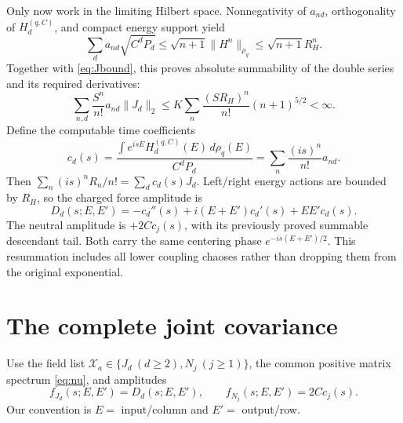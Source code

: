 \documentclass[11pt]{article}
\newcommand{\HH}{H^{(q,C)}}
\begin{document}
Only now work in the limiting Hilbert space. Nonnegativity of $a_{nd}$,
orthogonality of $\HH_d$, and compact energy support yield
\begin{equation}
 \sum_d a_{nd}\sqrt{C^dP_d}
 \le\sqrt{n+1}\|H^n\|_{\rho_q}\le\sqrt{n+1}R_H^n.
\end{equation}
Together with \eqref{eq:Jbound}, this proves absolute summability
of the double series and its required derivatives:
\begin{equation}
 \sum_{n,d}\frac{S^n}{n!}a_{nd}\|J_d\|_2
 \le K\sum_n\frac{(SR_H)^n}{n!}(n+1)^{5/2}<\infty.
\end{equation}
Define the computable time coefficients
\begin{equation}
 c_d(s)=\frac{\int e^{isE}\HH_d(E)\,d\rho_q(E)}{C^dP_d}
       =\sum_n\frac{(is)^n}{n!}a_{nd}.
\end{equation}
Then $\sum_n(is)^nR_n/n!=\sum_dc_d(s)J_d$.
Left/right energy actions are bounded by $R_H$, so the charged
force amplitude is
\begin{equation}
 D_d(s;E,E')=-c_d''(s)+i(E+E')c_d'(s)+EE'c_d(s).\label{eq:amplitude}
\end{equation}
The neutral amplitude is $+2C c_j(s)$, with its previously proved
summable descendant tail. Both carry the same centering phase
$e^{-is(E+E')/2}$. This resummation includes all lower coupling
chaoses rather than dropping them from the original exponential.

\newpage
\section{The complete joint covariance}
Use the field list $\mathcal X_a\in\{J_d\ (d\ge2),N_j\ (j\ge1)\}$,
the common positive matrix spectrum \eqref{eq:nu}, and amplitudes
\begin{equation}
 f_{J_d}(s;E,E')=D_d(s;E,E'),\qquad
 f_{N_j}(s;E,E')=2C c_j(s).
\end{equation}
Our convention is $E=$ input/column and $E'=$ output/row.
\end{document}
